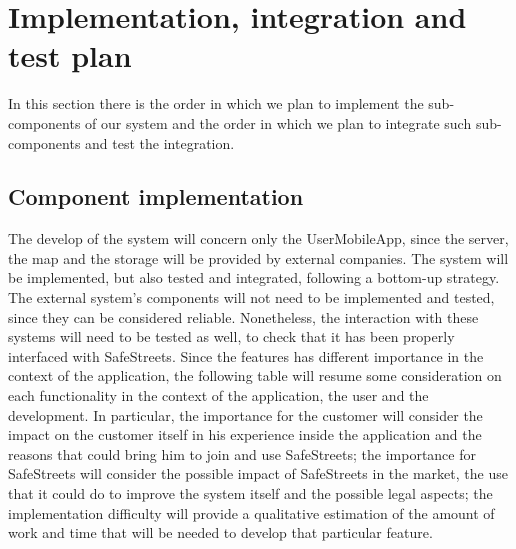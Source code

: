 \documentclass[../RASD.tex]{subfiles}
\begin{document}
    \chapter{Implementation, integration and test plan}\label{ch:implementation,-integration-and-test-plan}
    In this section there is the order in which we plan to implement the sub-components of our system
    and the order in which we plan to integrate such sub-components and test the integration.
    \section{Component implementation}\label{sec:component-implementation}
    The develop of the system will concern only the UserMobileApp, since the server, the map and the storage will be provided by external companies.
    The system will be implemented, but also tested and integrated, following a bottom-up strategy.
    The external system’s components will not need to be implemented and tested, since they can be considered reliable.
    Nonetheless, the interaction with these systems will need to be tested as well, to check that it has been properly interfaced with SafeStreets.
    Since the features has different importance in the context of the application, the following table will resume some consideration on each functionality
    in the context of the application, the user and the development.
    In particular, the importance for the customer will consider the impact on the customer itself in his experience inside the application and the reasons
    that could bring him to join and use SafeStreets;
    the importance for SafeStreets will consider the possible impact of SafeStreets in the market, the use that it could do to improve the system itself
    and the possible legal aspects;
    the implementation difficulty will provide a qualitative estimation of the amount of work and time that will be needed to develop that particular feature.
    \newpage
\end{document}
